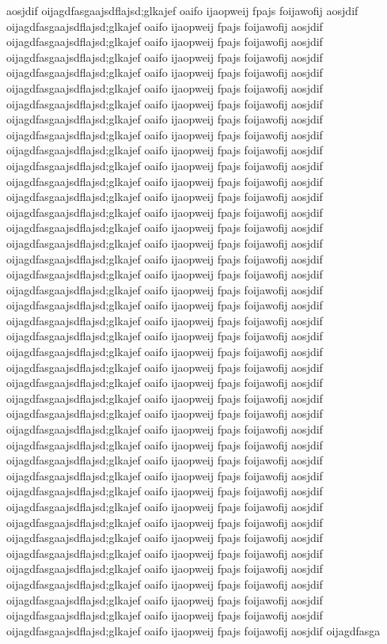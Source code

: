 \documentclass[twoside,a4paper,twocolumn,landscape]{PhanRaw}
\begin{document}
aosjdif oijagdfasgaajsdflajsd;glkajef oaifo ijaopweij fpajs foijawofij aosjdif oijagdfasgaajsdflajsd;glkajef oaifo ijaopweij fpajs foijawofij aosjdif oijagdfasgaajsdflajsd;glkajef oaifo ijaopweij fpajs foijawofij aosjdif oijagdfasgaajsdflajsd;glkajef oaifo ijaopweij fpajs foijawofij aosjdif oijagdfasgaajsdflajsd;glkajef oaifo ijaopweij fpajs foijawofij aosjdif oijagdfasgaajsdflajsd;glkajef oaifo ijaopweij fpajs foijawofij aosjdif oijagdfasgaajsdflajsd;glkajef oaifo ijaopweij fpajs foijawofij aosjdif oijagdfasgaajsdflajsd;glkajef oaifo ijaopweij fpajs foijawofij aosjdif oijagdfasgaajsdflajsd;glkajef oaifo ijaopweij fpajs foijawofij aosjdif oijagdfasgaajsdflajsd;glkajef oaifo ijaopweij fpajs foijawofij aosjdif oijagdfasgaajsdflajsd;glkajef oaifo ijaopweij fpajs foijawofij aosjdif oijagdfasgaajsdflajsd;glkajef oaifo ijaopweij fpajs foijawofij aosjdif oijagdfasgaajsdflajsd;glkajef oaifo ijaopweij fpajs foijawofij aosjdif oijagdfasgaajsdflajsd;glkajef oaifo ijaopweij fpajs foijawofij aosjdif oijagdfasgaajsdflajsd;glkajef oaifo ijaopweij fpajs foijawofij aosjdif oijagdfasgaajsdflajsd;glkajef oaifo ijaopweij fpajs foijawofij aosjdif oijagdfasgaajsdflajsd;glkajef oaifo ijaopweij fpajs foijawofij aosjdif oijagdfasgaajsdflajsd;glkajef oaifo ijaopweij fpajs foijawofij aosjdif oijagdfasgaajsdflajsd;glkajef oaifo ijaopweij fpajs foijawofij aosjdif oijagdfasgaajsdflajsd;glkajef oaifo ijaopweij fpajs foijawofij aosjdif oijagdfasgaajsdflajsd;glkajef oaifo ijaopweij fpajs foijawofij aosjdif oijagdfasgaajsdflajsd;glkajef oaifo ijaopweij fpajs foijawofij aosjdif oijagdfasgaajsdflajsd;glkajef oaifo ijaopweij fpajs foijawofij aosjdif oijagdfasgaajsdflajsd;glkajef oaifo ijaopweij fpajs foijawofij aosjdif oijagdfasgaajsdflajsd;glkajef oaifo ijaopweij fpajs foijawofij aosjdif oijagdfasgaajsdflajsd;glkajef oaifo ijaopweij fpajs foijawofij aosjdif oijagdfasgaajsdflajsd;glkajef oaifo ijaopweij fpajs foijawofij aosjdif oijagdfasgaajsdflajsd;glkajef oaifo ijaopweij fpajs foijawofij aosjdif oijagdfasgaajsdflajsd;glkajef oaifo ijaopweij fpajs foijawofij aosjdif oijagdfasgaajsdflajsd;glkajef oaifo ijaopweij fpajs foijawofij aosjdif oijagdfasgaajsdflajsd;glkajef oaifo ijaopweij fpajs foijawofij aosjdif oijagdfasgaajsdflajsd;glkajef oaifo ijaopweij fpajs foijawofij aosjdif oijagdfasgaajsdflajsd;glkajef oaifo ijaopweij fpajs foijawofij aosjdif oijagdfasgaajsdflajsd;glkajef oaifo ijaopweij fpajs foijawofij aosjdif oijagdfasgaajsdflajsd;glkajef oaifo ijaopweij fpajs foijawofij aosjdif oijagdfasgaajsdflajsd;glkajef oaifo ijaopweij fpajs foijawofij aosjdif oijagdfasgaajsdflajsd;glkajef oaifo ijaopweij fpajs foijawofij aosjdif oijagdfasgaajsdflajsd;glkajef oaifo ijaopweij fpajs foijawofij aosjdif oijagdfasgaajsdflajsd;glkajef oaifo ijaopweij fpajs foijawofij aosjdif oijagdfasgaajsdflajsd;glkajef oaifo ijaopweij fpajs foijawofij aosjdif oijagdfasgaajsdflajsd;glkajef oaifo ijaopweij fpajs foijawofij aosjdif oijagdfasga
\end{document}
